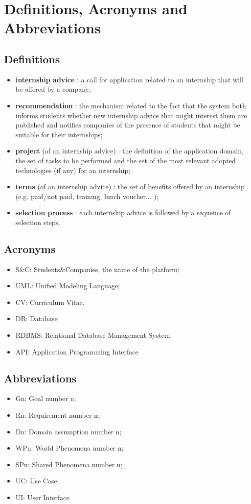 	\section{Definitions, Acronyms and Abbreviations}
		\subsection{Definitions}
			\begin{itemize}
				\item \textbf{internship advice} : a call for application related to an internship that will be offered by a company;
				\item \textbf{recommendation} : the mechanism related to the fact that the system both informs students whether new internship advice that might interest them are published and notifies companies of the presence of students that might be suitable for their internships;
				\item \textbf{project} (of an internship advice) : the definition of the application domain, the set of tasks to be performed and the set of the most relevant adopted technologies (if any) for an internship;
				\item \textbf{terms} (of an internship advice) : the set of benefits offered by an internship (e.g. paid/not paid, training, lunch voucher... );
				\item \textbf{selection process} : each internship advice is followed by a sequence of selection steps.
			\end{itemize}
		\subsection{Acronyms}
			\begin{itemize}
				\item S\&C: Students\&Companies, the name of the platform;
				\item UML: Unified Modeling Language;
				\item CV: Curriculum Vitae.
				\item DB: Database
				\item RDBMS: Relational Database Management System
				\item API: Application Programming Interface
			\end{itemize}
		\subsection{Abbreviations}
			\begin{itemize}
				\item Gn: Goal number n;
				\item Rn: Requirement number n;
				\item Dn: Domain assumption number n;
				\item WPn: World Phenomena number n;
				\item SPn: Shared Phenomena number n;
				\item UC: Use Case.
				\item UI: User Interface
			\end{itemize}
